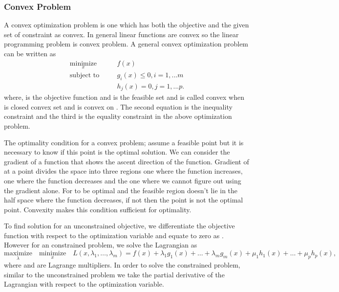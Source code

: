 \subsubsection{Convex Problem}

A convex optimization problem is one which has both the objective and the given set of constraint as convex. In general linear functions are convex so the linear programming problem is convex problem. A general convex optimization problem can be written as
\begin{eqnarray}
\underset{x}{\text{minimize}} \quad && f(x) \\
\text{subject to} \quad && g_i(x) \leq 0, i = 1,...m\\
&& h_j(x) = 0, j = 1,...p.
\end{eqnarray}
where,  is the objective function and  \me{\subset}  is the feasible set and is called convex when  is closed convex set and  is convex on . The second equation is the inequality constraint and the third is the equality constraint in the above optimization problem.
\par
The optimality condition for a convex problem; assume a feasible point  but it is necessary to know if this point is the optimal solution. We can consider the gradient of a function  that shows the ascent direction of the function. Gradient of  at a point  divides the space into three regions one where the function increases, one where the function decreases and the one where we cannot figure out using the gradient alone. For  to be optimal and the feasible region doesn't lie in the half space where the function decreases, if not then the point  is not the optimal point. Convexity makes this condition sufficient for optimality. 
\par
To find solution for an unconstrained objective, we differentiate the objective function with respect to the optimization variable  and equate to zero as . However for an constrained problem, we solve the Lagrangian as
\begin{equation}
\underset{\lambda}{\text{maximize}} \quad \underset{x}{\text{minimize}} \quad  L(x,\lambda_1, \dotsc,\lambda_m) =  f(x) + \lambda_1 g_1(x) + \dotsc + \lambda_m g_m(x) + \mu_1 h_1 (x) + \dotsc + \mu_p h_p(x),
\end{equation}
where  and  are Lagrange multipliers. In order to solve the constrained problem, similar to the unconstrained problem we take the partial derivative of the Lagrangian with respect to the optimization variable.
